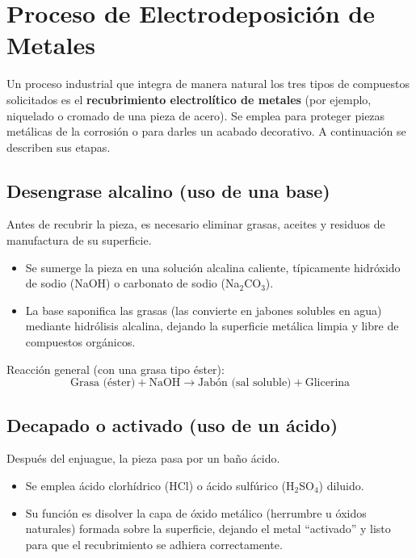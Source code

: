 \documentclass{article}
\begin{document}
    \portada{}
    \newpage
    
    \section{Proceso de Electrodeposición de Metales}

Un proceso industrial que integra de manera natural los tres tipos de compuestos solicitados es el \textbf{recubrimiento electrolítico de metales} (por ejemplo, niquelado o cromado de una pieza de acero). Se emplea para proteger piezas metálicas de la corrosión o para darles un acabado decorativo. A continuación se describen sus etapas.

\subsection{Desengrase alcalino (uso de una base)}

Antes de recubrir la pieza, es necesario eliminar grasas, aceites y residuos de manufactura de su superficie.

\begin{itemize}
    \item Se sumerge la pieza en una solución alcalina caliente, típicamente hidróxido de sodio (NaOH) o carbonato de sodio (Na$_2$CO$_3$).
    \item La base saponifica las grasas (las convierte en jabones solubles en agua) mediante hidrólisis alcalina, dejando la superficie metálica limpia y libre de compuestos orgánicos.
\end{itemize}

Reacción general (con una grasa tipo éster):
\begin{equation}
    \text{Grasa (éster)} + \text{NaOH} \rightarrow \text{Jabón (sal soluble)} + \text{Glicerina}
\end{equation}

\subsection{Decapado o activado (uso de un ácido)}

Después del enjuague, la pieza pasa por un baño ácido.

\begin{itemize}
    \item Se emplea ácido clorhídrico (HCl) o ácido sulfúrico (H$_2$SO$_4$) diluido.
    \item Su función es disolver la capa de óxido metálico (herrumbre u óxidos naturales) formada sobre la superficie, dejando el metal ``activado'' y listo para que el recubrimiento se adhiera correctamente.
\end{itemize}
\end{document}
